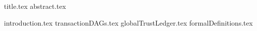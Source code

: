 \documentclass[11pt]{llncs}
\begin{document}
{title.tex}
\thispagestyle{plain}
{abstract.tex}

{introduction.tex}
{transactionDAGs.tex}
{globalTrustLedger.tex}
{formalDefinitions.tex}

\end{document}
